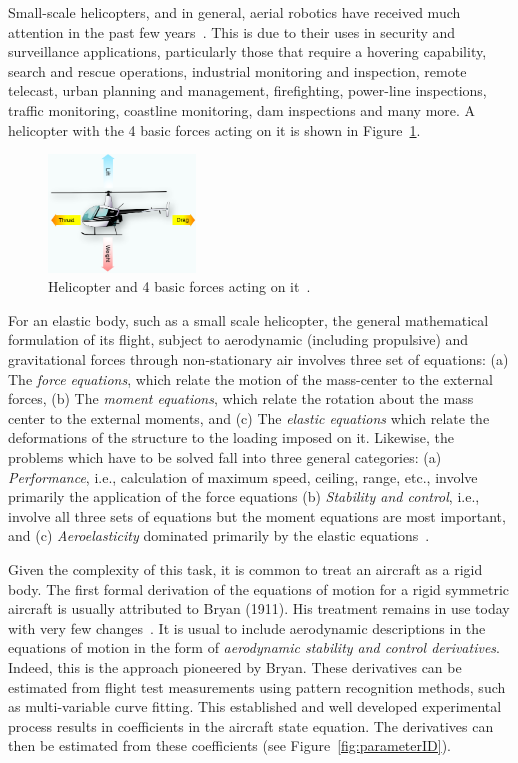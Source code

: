 \documentclass{article}
\begin{document}
Small-scale helicopters, and in general, aerial robotics have received much attention in the past few years~\cite{2006_JNL_Heli_Wendel}.  This is due to their uses in security and surveillance applications, particularly those that require a hovering capability, search and rescue operations, industrial monitoring and inspection, remote telecast, urban planning and management, firefighting, power-line inspections, traffic monitoring, coastline monitoring, dam inspections and many more.  A helicopter with the 4 basic forces acting on it is shown in Figure~\ref{fig:heli_forces}.

\begin{figure}[t]
\centering	
\includegraphics[width=0.35\textwidth]{figs/HELI_forces.png}
\caption{Helicopter and 4 basic forces acting on it~\cite{2012_BOOK_Heli_USDoT}.} 
\label{fig:heli_forces}				
\end{figure}


For an elastic body, such as a small scale helicopter, the general mathematical formulation of its flight, subject to aerodynamic (including propulsive) and gravitational forces through non-stationary air involves three set of equations: (a) The \emph{force equations}, which relate the motion of the mass-center to the external forces, (b) The \emph{moment equations}, which relate the rotation about the mass center to the external moments, and (c) The \emph{elastic equations} which relate the deformations of the structure to the loading imposed on it.  Likewise, the problems which have to be solved fall into three general categories: (a) \emph{Performance}, i.e., calculation of maximum speed, ceiling, range, etc., involve primarily the application of the force equations (b) \emph{Stability and control}, i.e., involve all three sets of equations but the moment equations are most important, and (c) \emph{Aeroelasticity} dominated primarily by the elastic equations~\cite{1959_BOOK_Flight_Etkin}. 

Given the complexity of this task, it is common to treat an aircraft as a rigid body.  The first formal derivation of the equations of motion for a rigid symmetric aircraft is usually attributed to Bryan (1911).  His treatment remains in use today with very few changes~\cite{2012_BOOK_Flight_Cook}.  It is usual to include aerodynamic descriptions in the equations of motion in the form of \emph{aerodynamic stability and control derivatives}.  Indeed, this is the approach pioneered by Bryan.  These derivatives can be estimated from flight test measurements using pattern recognition methods, such as multi-variable curve fitting.  This established and well developed experimental process results in coefficients in the aircraft state equation.  The derivatives can then be estimated from these coefficients (see Figure~\ref{fig:parameterID}).  
\end{document}

